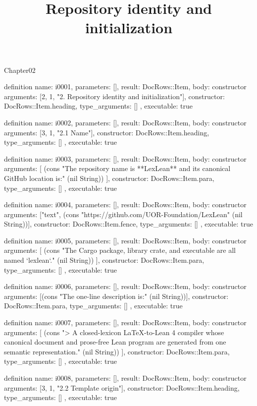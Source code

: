 \begin{lexlean}{Chapter02}
\title{Repository identity and initialization}
\begin{semanticmodule}
definition{
  name: i0001,
  parameters: [],
  result: DocRows::Item,
  body: constructor{
    arguments: [2, 1, "2. Repository identity and initialization"],
    constructor: DocRows::Item.heading,
    type_arguments: []
  },
  executable: true
}

definition{
  name: i0002,
  parameters: [],
  result: DocRows::Item,
  body: constructor{
    arguments: [3, 1, "2.1 Name"],
    constructor: DocRows::Item.heading,
    type_arguments: []
  },
  executable: true
}

definition{
  name: i0003,
  parameters: [],
  result: DocRows::Item,
  body: constructor{
    arguments: [
      (cons "The repository name is **LexLean** and its canonical GitHub location is:" (nil String))
    ],
    constructor: DocRows::Item.para,
    type_arguments: []
  },
  executable: true
}

definition{
  name: i0004,
  parameters: [],
  result: DocRows::Item,
  body: constructor{
    arguments: ["text", (cons "https://github.com/UOR-Foundation/LexLean" (nil String))],
    constructor: DocRows::Item.fence,
    type_arguments: []
  },
  executable: true
}

definition{
  name: i0005,
  parameters: [],
  result: DocRows::Item,
  body: constructor{
    arguments: [
      (cons "The Cargo package, library crate, and executable are all named `lexlean`." (nil String))
    ],
    constructor: DocRows::Item.para,
    type_arguments: []
  },
  executable: true
}

definition{
  name: i0006,
  parameters: [],
  result: DocRows::Item,
  body: constructor{
    arguments: [(cons "The one-line description is:" (nil String))],
    constructor: DocRows::Item.para,
    type_arguments: []
  },
  executable: true
}

definition{
  name: i0007,
  parameters: [],
  result: DocRows::Item,
  body: constructor{
    arguments: [
      (cons "> A closed-lexicon LaTeX-to-Lean 4 compiler whose canonical document and prose-free Lean program are generated from one semantic representation." (nil String))
    ],
    constructor: DocRows::Item.para,
    type_arguments: []
  },
  executable: true
}

definition{
  name: i0008,
  parameters: [],
  result: DocRows::Item,
  body: constructor{
    arguments: [3, 1, "2.2 Template origin"],
    constructor: DocRows::Item.heading,
    type_arguments: []
  },
  executable: true
}


\end{semanticmodule}
\end{lexlean}
